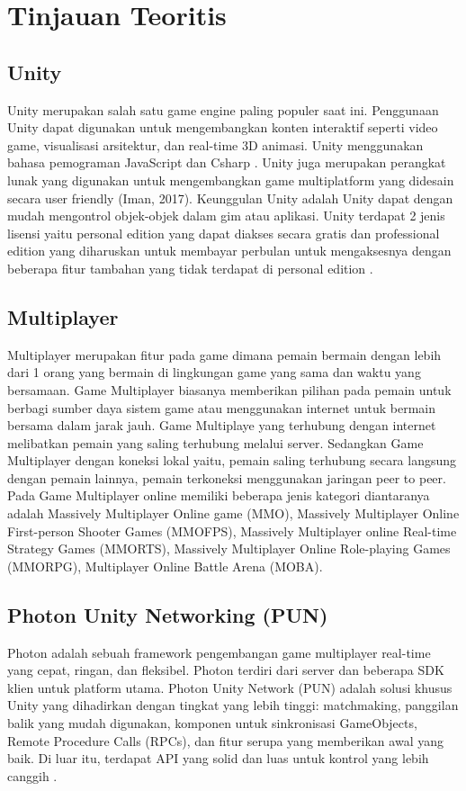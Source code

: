 \section{Tinjauan Teoritis}
\subsection{Unity}
Unity merupakan salah satu game engine paling populer saat ini. Penggunaan Unity dapat digunakan untuk mengembangkan konten interaktif seperti video game, 
visualisasi arsitektur, dan real-time 3D animasi. Unity menggunakan bahasa pemograman JavaScript dan 
Csharp \cite{Ansori}. Unity juga merupakan perangkat lunak yang digunakan untuk mengembangkan game multiplatform yang didesain secara user friendly 
(Iman, 2017). Keunggulan Unity adalah Unity 
dapat dengan mudah mengontrol objek-objek 
dalam gim atau aplikasi. Unity terdapat 2 jenis 
lisensi yaitu personal edition yang dapat diakses 
secara gratis dan professional edition yang 
diharuskan untuk membayar perbulan untuk 
mengaksesnya dengan beberapa fitur tambahan 
yang tidak terdapat di personal edition \cite{Sarwodi}. 

\subsection{Multiplayer}
Multiplayer merupakan fitur pada game dimana pemain bermain dengan lebih dari 1 orang yang bermain 
di lingkungan game yang sama dan waktu yang bersamaan. Game Multiplayer biasanya memberikan pilihan pada 
pemain untuk berbagi sumber daya sistem game atau menggunakan internet untuk bermain bersama dalam jarak 
jauh. Game Multiplaye yang terhubung dengan internet melibatkan pemain yang saling terhubung melalui server. 
Sedangkan Game Multiplayer dengan koneksi lokal yaitu, pemain saling terhubung secara langsung dengan 
pemain lainnya, pemain terkoneksi menggunakan jaringan peer to peer. Pada Game Multiplayer online memiliki 
beberapa jenis kategori diantaranya adalah Massively Multiplayer Online game (MMO), Massively Multiplayer 
Online First-person Shooter Games (MMOFPS), Massively Multiplayer online Real-time Strategy Games
(MMORTS), Massively Multiplayer Online Role-playing Games (MMORPG), Multiplayer Online Battle Arena
(MOBA)\cite{Ansori}.

\subsection{Photon Unity Networking (PUN)}
Photon adalah sebuah framework pengembangan game multiplayer real-time yang cepat, ringan, dan fleksibel. Photon terdiri dari server dan beberapa SDK klien untuk platform utama.
Photon Unity Network (PUN) adalah solusi khusus Unity yang dihadirkan dengan tingkat yang lebih tinggi: matchmaking, panggilan balik yang mudah digunakan, komponen untuk sinkronisasi GameObjects, Remote Procedure Calls (RPCs), dan fitur serupa yang memberikan awal yang baik. Di luar itu, terdapat API yang solid dan luas untuk kontrol yang lebih canggih \cite{pun}.

